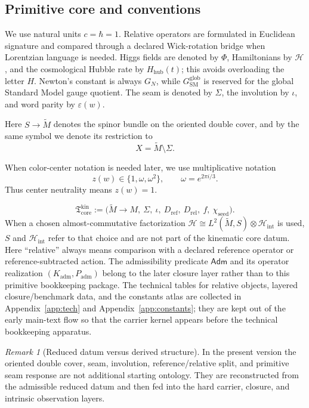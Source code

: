 \documentclass[11pt,a4paper]{article}
\theoremstyle{definition}
\theoremstyle{remark}
\newtheorem*{remark}{Remark}
\newcommand{\Seam}{\Sigma}
\newcommand{\inv}{\iota}
\newcommand{\SM}{\mathrm{SM}}
\newcommand{\Hhub}{H_{\mathrm{hub}}}
\newcommand{\Hint}{\mathcal H_{\mathrm{int}}}
\newcommand{\Kadm}{K_{\mathrm{adm}}}
\newcommand{\chiseed}{\chi_{\mathrm{seed}}}
\newcommand{\Tcore}{\mathfrak T_{\mathrm{core}}}
\newcommand{\Padm}{P_{\mathrm{adm}}}
\begin{document}
\subsection{Primitive core and conventions}

We use natural units $c=\hbar=1$. Relative operators are formulated in Euclidean signature and compared through a declared Wick-rotation bridge when Lorentzian language is needed. Higgs fields are denoted by $\Phi$, Hamiltonians by $\mathcal H$, and the cosmological Hubble rate by $\Hhub(t)$; this avoids overloading the letter $H$. Newton's constant is always $G_N$, while $G_{\SM}^{\mathrm{glob}}$ is reserved for the global Standard Model gauge quotient. The seam is denoted by $\Seam$, the involution by $\inv$, and word parity by $\varepsilon(w)$.

Here $S\to \widetilde M$ denotes the spinor bundle on the oriented double cover, and by the same symbol we denote its restriction to
\[
X=\widetilde M\setminus\Seam.
\]

When color-center notation is needed later, we use multiplicative notation
\[
z(w)\in\{1,\omega,\omega^2\},
\qquad
\omega=e^{2\pi i/3}.
\]
Thus center neutrality means $z(w)=1$.

\[
\Tcore^{\mathrm{kin}}
:=
\bigl(
\widetilde M\to M,\ \Seam,\ \inv,\ D_{\mathrm{ref}},\ D_{\mathrm{rel}},\ f,\ \chiseed
\bigr).
\]
When a chosen almost-commutative factorization
$\mathcal H\cong L^2(\widetilde M,S)\otimes\Hint$ is used, $S$ and $\Hint$ refer to that
choice and are not part of the kinematic core datum.
Here \enquote{relative} always means comparison with a declared reference operator or reference-subtracted action. The admissibility predicate $\mathsf{Adm}$ and its operator realization $(\Kadm,\Padm)$ belong to the later closure layer rather than to this primitive bookkeeping package. The technical tables for relative objects, layered closure/benchmark data, and the constants atlas are collected in Appendix~\ref{app:tech} and Appendix~\ref{app:constants}; they are kept out of the early main-text flow so that the carrier kernel appears before the technical bookkeeping apparatus.

\begin{remark}[Reduced datum versus derived structure]
In the present version the oriented double cover, seam, involution, reference/relative
split, and primitive seam response are not additional starting ontology. They are reconstructed
from the admissible reduced datum and then fed into the hard carrier, closure, and intrinsic
observation layers.
\end{remark}
\end{document}
